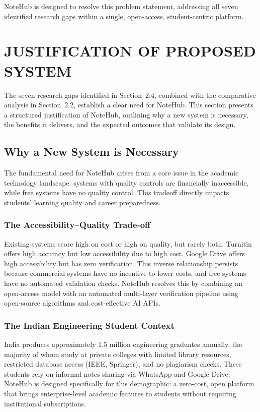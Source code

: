 \documentclass[12,Times new Roman,a4paper]{report}
\begin{document}
NoteHub is designed to resolve this problem statement, addressing all seven identified research gaps within a single, open-access, student-centric platform.

\section{JUSTIFICATION OF PROPOSED SYSTEM}

The seven research gaps identified in Section~2.4, combined with the comparative analysis in Section~2.2, establish a clear need for NoteHub. This section presents a structured justification of NoteHub, outlining why a new system is necessary, the benefits it delivers, and the expected outcomes that validate its design.

\subsection{Why a New System is Necessary}
The fundamental need for NoteHub arises from a core issue in the academic technology landscape: systems with quality controls are financially inaccessible, while free systems have no quality control. This tradeoff directly impacts students' learning quality and career preparedness.

\subsubsection*{The Accessibility--Quality Trade-off}
Existing systems score high on cost or high on quality, but rarely both. Turnitin offers high accuracy but low accessibility due to high cost. Google Drive offers high accessibility but has zero verification. This inverse relationship persists because commercial systems have no incentive to lower costs, and free systems have no automated validation checks. NoteHub resolves this by combining an open-access model with an automated multi-layer verification pipeline using open-source algorithms and cost-effective AI APIs.

\subsubsection*{The Indian Engineering Student Context}
India produces approximately 1.5 million engineering graduates annually, the majority of whom study at private colleges with limited library resources, restricted database access (IEEE, Springer), and no plagiarism checks. These students rely on informal notes sharing via WhatsApp and Google Drive. NoteHub is designed specifically for this demographic: a zero-cost, open platform that brings enterprise-level academic features to students without requiring institutional subscriptions.
\end{document}
